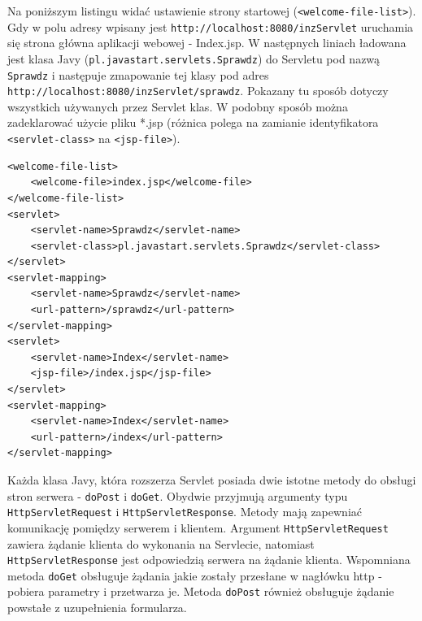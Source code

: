 \documentclass[eng,printmode,oneside]{mgr}
\begin{document}
Na poniższym listingu widać ustawienie strony startowej
(\texttt{<welcome-file-list>}). Gdy w polu adresy wpisany jest
\texttt{http://localhost:8080/inzServlet} uruchamia się strona główna aplikacji
webowej - Index.jsp. W następnych liniach ładowana jest klasa
Javy (\texttt{pl.javastart.servlets.Sprawdz}) do Servletu pod nazwą
\texttt{Sprawdz} i następuje zmapowanie tej klasy pod adres
\texttt{http://localhost:8080/inzServlet/sprawdz}. Pokazany tu sposób dotyczy
wszystkich używanych przez Servlet klas. W podobny sposób można zadeklarować użycie
pliku *.jsp (różnica polega na zamianie identyfikatora \texttt{<servlet-class>}
na \texttt{<jsp-file>}). 

\lstset{language=XML,firstnumber=1,stepnumber=1}
\begin{lstlisting}[caption=Fragment pliku web.xml,label=lst:web.xml]
<welcome-file-list>
	<welcome-file>index.jsp</welcome-file>
</welcome-file-list>
<servlet>
	<servlet-name>Sprawdz</servlet-name>
	<servlet-class>pl.javastart.servlets.Sprawdz</servlet-class>
</servlet>
<servlet-mapping>
	<servlet-name>Sprawdz</servlet-name>
	<url-pattern>/sprawdz</url-pattern>
</servlet-mapping>
<servlet>
	<servlet-name>Index</servlet-name>
	<jsp-file>/index.jsp</jsp-file>
</servlet>
<servlet-mapping>
	<servlet-name>Index</servlet-name>
	<url-pattern>/index</url-pattern>
</servlet-mapping>
\end{lstlisting}

Każda klasa Javy, która rozszerza Servlet posiada dwie istotne metody do obsługi
stron serwera - \texttt{doPost} i \texttt{doGet}. Obydwie przyjmują argumenty
typu \texttt{HttpServletRequest} i \texttt{HttpServletResponse}.
Metody mają zapewniać komunikację pomiędzy serwerem i klientem. Argument
\texttt{HttpServletRequest} zawiera żądanie klienta do wykonania na Servlecie,
natomiast \texttt{HttpServletResponse} jest odpowiedzią serwera na żądanie
klienta.
Wspomniana metoda \texttt{doGet} obsługuje żądania jakie zostały przesłane w
nagłówku http - pobiera parametry i przetwarza je. Metoda \texttt{doPost}
również obsługuje żądanie powstałe z uzupełnienia formularza.
\end{document}
